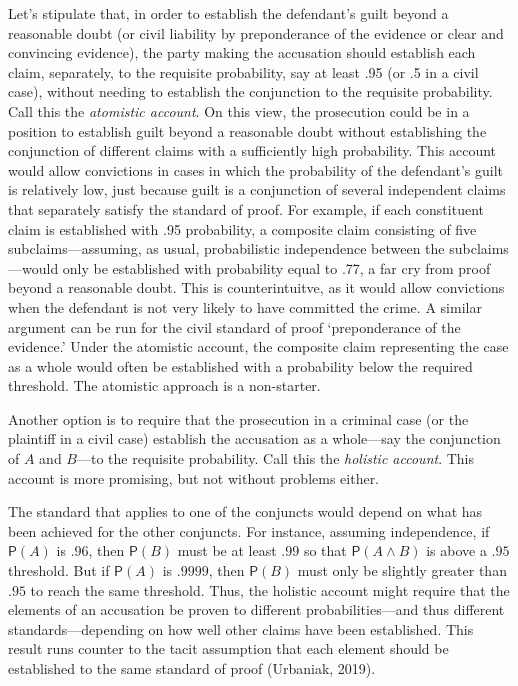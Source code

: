 \documentclass[
  10pt,
  dvipsnames,enabledeprecatedfontcommands]{scrartcl}
\newcommand{\et}{\wedge}
\newcommand{\pr}[1]{\ensuremath{\mathsf{P}(#1)}}
\begin{document}
Let's stipulate that, in order to establish the defendant's guilt beyond
a reasonable doubt (or civil liability by preponderance of the evidence
or clear and convincing evidence), the party making the accusation
should establish each claim, separately, to the requisite probability,
say at least .95 (or .5 in a civil case), without needing to establish
the conjunction to the requisite probability. Call this the
\textit{atomistic account}. On this view, the prosecution could be in a
position to establish guilt beyond a reasonable doubt without
establishing the conjunction of different claims with a sufficiently
high probability. This account would allow convictions in cases in which
the probability of the defendant's guilt is relatively low, just because
guilt is a conjunction of several independent claims that separately
satisfy the standard of proof. For example, if each constituent claim is
established with .95 probability, a composite claim consisting of five
subclaims---assuming, as usual, probabilistic independence between the
subclaims---would only be established with probability equal to .77, a
far cry from proof beyond a reasonable doubt. This is counterintuitve,
as it would allow convictions when the defendant is not very likely to
have committed the crime. A similar argument can be run for the civil
standard of proof `preponderance of the evidence.' Under the atomistic
account, the composite claim representing the case as a whole would
often be established with a probability below the required threshold.
The atomistic approach is a non-starter.

Another option is to require that the prosecution in a criminal case (or
the plaintiff in a civil case) establish the accusation as a whole---say
the conjunction of \(A\) and \(B\)---to the requisite probability. Call
this the \textit{holistic account}. This account is more promising, but
not without problems either.

The standard that applies to one of the conjuncts would depend on what
has been achieved for the other conjuncts. For instance, assuming
independence, if \(\pr{A}\) is \(.96\), then \(\pr{B}\) must be at least
\(.99\) so that \(\pr{A\et B}\) is above a \(.95\) threshold. But if
\(\pr{A}\) is \(.9999\), then \(\pr{B}\) must only be slightly greater
than \(.95\) to reach the same threshold. Thus, the holistic account
might require that the elements of an accusation be proven to different
probabilities---and thus different standards---depending on how well
other claims have been established. This result runs counter to the
tacit assumption that each element should be established to the same
standard of proof (Urbaniak, 2019).
\end{document}
